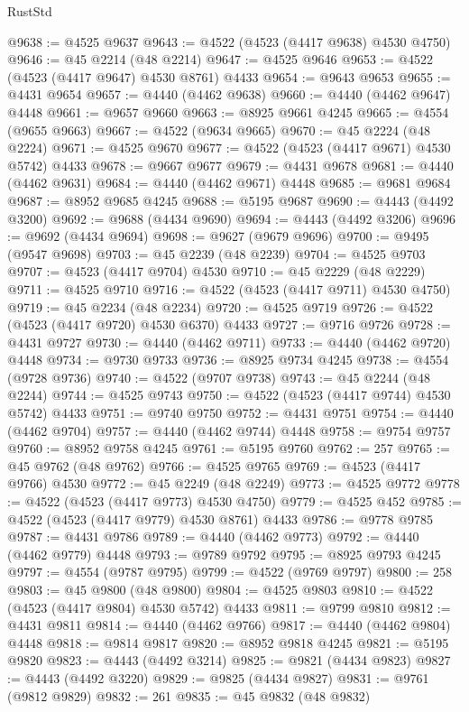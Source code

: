\begin{lexlean}{RustStd}
\begin{coremodule}
@9638 := @4525 @9637
@9643 := @4522 (@4523 (@4417 @9638) @4530 @4750)
@9646 := @45 @2214 (@48 @2214)
@9647 := @4525 @9646
@9653 := @4522 (@4523 (@4417 @9647) @4530 @8761) @4433
@9654 := @9643 @9653
@9655 := @4431 @9654
@9657 := @4440 (@4462 @9638)
@9660 := @4440 (@4462 @9647) @4448
@9661 := @9657 @9660
@9663 := @8925 @9661 @4245
@9665 := @4554 (@9655 @9663)
@9667 := @4522 (@9634 @9665)
@9670 := @45 @2224 (@48 @2224)
@9671 := @4525 @9670
@9677 := @4522 (@4523 (@4417 @9671) @4530 @5742) @4433
@9678 := @9667 @9677
@9679 := @4431 @9678
@9681 := @4440 (@4462 @9631)
@9684 := @4440 (@4462 @9671) @4448
@9685 := @9681 @9684
@9687 := @8952 @9685 @4245
@9688 := @5195 @9687
@9690 := @4443 (@4492 @3200)
@9692 := @9688 (@4434 @9690)
@9694 := @4443 (@4492 @3206)
@9696 := @9692 (@4434 @9694)
@9698 := @9627 (@9679 @9696)
@9700 := @9495 (@9547 @9698)
@9703 := @45 @2239 (@48 @2239)
@9704 := @4525 @9703
@9707 := @4523 (@4417 @9704) @4530
@9710 := @45 @2229 (@48 @2229)
@9711 := @4525 @9710
@9716 := @4522 (@4523 (@4417 @9711) @4530 @4750)
@9719 := @45 @2234 (@48 @2234)
@9720 := @4525 @9719
@9726 := @4522 (@4523 (@4417 @9720) @4530 @6370) @4433
@9727 := @9716 @9726
@9728 := @4431 @9727
@9730 := @4440 (@4462 @9711)
@9733 := @4440 (@4462 @9720) @4448
@9734 := @9730 @9733
@9736 := @8925 @9734 @4245
@9738 := @4554 (@9728 @9736)
@9740 := @4522 (@9707 @9738)
@9743 := @45 @2244 (@48 @2244)
@9744 := @4525 @9743
@9750 := @4522 (@4523 (@4417 @9744) @4530 @5742) @4433
@9751 := @9740 @9750
@9752 := @4431 @9751
@9754 := @4440 (@4462 @9704)
@9757 := @4440 (@4462 @9744) @4448
@9758 := @9754 @9757
@9760 := @8952 @9758 @4245
@9761 := @5195 @9760
@9762 := 257
@9765 := @45 @9762 (@48 @9762)
@9766 := @4525 @9765
@9769 := @4523 (@4417 @9766) @4530
@9772 := @45 @2249 (@48 @2249)
@9773 := @4525 @9772
@9778 := @4522 (@4523 (@4417 @9773) @4530 @4750)
@9779 := @4525 @452
@9785 := @4522 (@4523 (@4417 @9779) @4530 @8761) @4433
@9786 := @9778 @9785
@9787 := @4431 @9786
@9789 := @4440 (@4462 @9773)
@9792 := @4440 (@4462 @9779) @4448
@9793 := @9789 @9792
@9795 := @8925 @9793 @4245
@9797 := @4554 (@9787 @9795)
@9799 := @4522 (@9769 @9797)
@9800 := 258
@9803 := @45 @9800 (@48 @9800)
@9804 := @4525 @9803
@9810 := @4522 (@4523 (@4417 @9804) @4530 @5742) @4433
@9811 := @9799 @9810
@9812 := @4431 @9811
@9814 := @4440 (@4462 @9766)
@9817 := @4440 (@4462 @9804) @4448
@9818 := @9814 @9817
@9820 := @8952 @9818 @4245
@9821 := @5195 @9820
@9823 := @4443 (@4492 @3214)
@9825 := @9821 (@4434 @9823)
@9827 := @4443 (@4492 @3220)
@9829 := @9825 (@4434 @9827)
@9831 := @9761 (@9812 @9829)
@9832 := 261
@9835 := @45 @9832 (@48 @9832)

\end{coremodule}
\end{lexlean}
